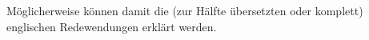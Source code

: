 Möglicherweise können damit die (zur Hälfte übersetzten oder komplett) englischen Redewendungen erklärt werden.


\begin{comment}

Vielleicht können damit auch einige (zur Hälfte übersetzt oder komplett auf Englisch) englische Idiome und Redewendungen erklärt werden.
(Bsp!)
Eventuell werden manche davon benutzt, weil sie sich in dem konkreten Kontext besonders gut dafür eignen, um einen Sachverhalt zu veranschaulichen und keine genaue Übersetzung auf Spanisch existiert.
Das ist jedoch nicht immer der Fall und Redewendungen, die zur Hälfte auf Spanisch und zur Hälfte auf Englisch abgedruckt sind (``vivir su happily ever after'', ``la voz en off''), dienen höchstwahrscheinlich einfach als ein Mechasnisum zum Erregen der Aufmerksamkeit.
\end{comment}

\begin{comment}

\cite{Beer2002}
"the magazines define Latinas primarily as consumers, they are a limited forum for women to explore noncosumerist identities, challenge hegemony, or express oppositional points of view."
"In addition, contemporarary consumer magazines offer advertisers a variety of "value-added" promotions, such as covert ads in the form of product mentions, and, although they are loathe to admit it, tolerate advertiser input into editorial content."


"It might be argued that, precisely because sexual imagery is designed to make the sale, it must, in some way, fulfill the passions it promises."
"We have noticed recently a trend toward a particular type of ad, increasingly more focused on sexuality, yet done with a tone wholly devoid of affect. Looking at these images one might correctly observe that after almost a hundred years of selling sex, the thrill seems to be gone."

"With the commodification of sex, the basic proposition is unatteinable. In terms of human passions, sex ads fail to satisfy because they confuse sexual gratification with the possession of objects. They attempt to substitute a state of *being* with the promise of *having*."

"The lack of affirmative portrayals of women's sexual passions leaves representations of female fulfillment impossible. [...] At worst, these images reinforce a patriarchal predisposition to disrespect women and do violence against them."
\end{comment}

